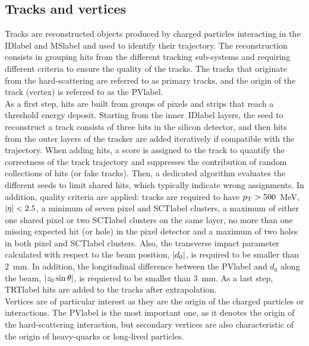 \subsection{Tracks and vertices}

Tracks are reconstructed objects produced by charged particles interacting in the \acrshort{IDlabel} and \acrshort{MSlabel} and used to identify their trajectory. The reconstruction consists in grouping hits from the different tracking sub-systems and requiring different criteria to ensure the quality of the tracks. The tracks that originate from the hard-scattering are referred to as primary tracks, and the origin of the track (vertex) is referred to as the \acrfull{PVlabel}.\\

As a first step, hits are built from groups of pixels and strips that reach a threshold energy deposit. Starting from the inner~\acrshort{IDlabel} layers, the seed to reconstruct a track consists of three hits in the silicon detector, and then hits from the outer layers of the tracker are added iteratively if compatible with the trajectory. When adding hits, a score is assigned to the track to quantify the correctness of the track trajectory and suppresses the contribution of random collections of hits (or fake tracks). Then, a dedicated algorithm evaluates the different seeds to limit shared hits, which typically indicate wrong assignments. In addition, quality criteria are applied: tracks are required to have $p_{\text{T}}>500$~MeV, $\abs{\eta}<2.5$, a minimum of seven pixel and \acrshort{SCTlabel} clusters, a maximum of either one shared pixel or two \acrshort{SCTlabel} clusters on the same layer, no more than one missing expected hit (or hole) in the pixel detector and a maximum of two holes in both pixel and \acrshort{SCTlabel} clusters. Also, the transverse impact parameter calculated with respect to the beam position, $\abs{d_0}$, is required to be smaller than 2~mm. In addition, the longitudinal difference between the \acrshort{PVlabel} and $d_0$ along the beam, $\abs{z_0 \sin\theta}$, is requiered to be smaller than 3~mm. As a last step, \acrshort{TRTlabel} hits are added to the tracks after extrapolation.\\

Vertices are of particular interest as they are the origin of the charged particles or interactions. The \acrshort{PVlabel} is the most important one, as it denotes the origin of the hard-scattering interaction, but secondary vertices are also characteristic of the origin of heavy-quarks or long-lived particles.\\


